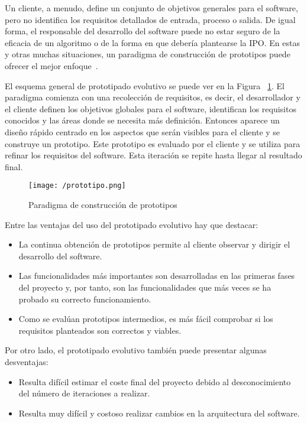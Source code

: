 Un cliente, a menudo, define un conjunto de objetivos generales para el software, pero no identifica
los requisitos detallados de entrada, proceso o salida. De igual forma, el responsable del
desarrollo del software puede no estar seguro de la eficacia de un algoritmo o de la forma en que
debería plantearse la \acs{IPO}. En estas y otras muchas situaciones, un paradigma de construcción
de prototipos puede ofrecer el mejor enfoque~\cite{Pressman10}.

El esquema general de prototipado evolutivo se puede ver en la Figura ~\ref{fig:prototipo}. El
paradigma comienza con una recolección de requisitos, es decir, el desarrollador y el cliente
definen los objetivos globales para el software, identifican los requisitos conocidos y las áreas
donde se necesita más definición. Entonces aparece un diseño rápido centrado en los aspectos que
serán visibles para el cliente y se construye un prototipo. Este prototipo es evaluado por el
cliente y se utiliza para refinar los requisitos del software. Esta iteración se repite hasta llegar
al resultado final.

\begin{figure}[!h]
  \begin{center}
    \texttt{[image: /prototipo.png]}
    \caption{Paradigma de construcción de prototipos}
    \label{fig:prototipo}
  \end{center}
\end{figure}

Entre las ventajas del uso del prototipado evolutivo hay que destacar:

\begin{itemize}
  \item La continua obtención de prototipos permite al cliente observar y dirigir el desarrollo del
    software.
  \item Las funcionalidades más importantes son desarrolladas en las primeras fases del proyecto y,
    por tanto, son las funcionalidades que más veces se ha probado su correcto funcionamiento.
  \item Como se evalúan prototipos intermedios, es más fácil comprobar si los requisitos planteados
    son correctos y viables.
\end{itemize}

Por otro lado, el prototipado evolutivo  también puede presentar algunas desventajas:

\begin{itemize}
  \item Resulta difícil estimar el coste final del proyecto debido al desconocimiento del número de
    iteraciones a realizar.
  \item Resulta muy difícil y costoso realizar cambios en la arquitectura del software.
\end{itemize}

